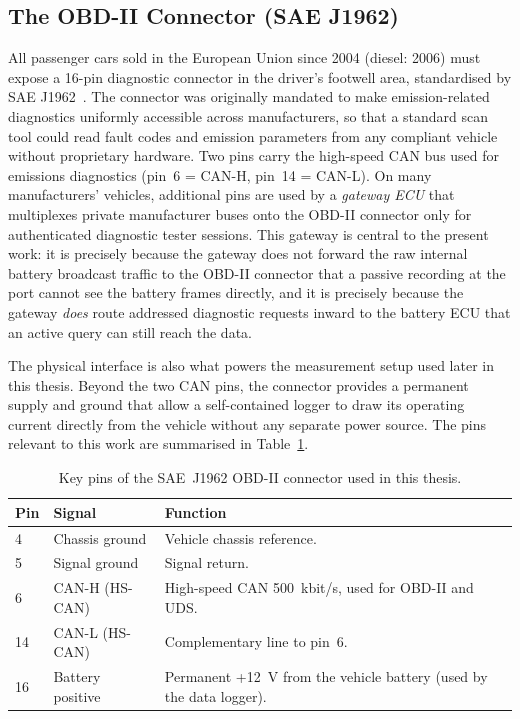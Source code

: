 \documentclass[11pt,a4paper,oneside,parskip=half]{scrreprt}
\begin{document}
\subsection{The OBD-II Connector (SAE J1962)}
All passenger cars sold in the European Union since 2004 (diesel: 2006) must expose a 16-pin diagnostic connector in the driver's footwell area, standardised by SAE J1962~\cite{saej1962}. The connector was originally mandated to make emission-related diagnostics uniformly accessible across manufacturers, so that a standard scan tool could read fault codes and emission parameters from any compliant vehicle without proprietary hardware. Two pins carry the high-speed CAN bus used for emissions diagnostics (pin~6 = CAN-H, pin~14 = CAN-L). On many manufacturers' vehicles, additional pins are used by a \textit{gateway ECU} that multiplexes private manufacturer buses onto the OBD-II connector only for authenticated diagnostic tester sessions. This gateway is central to the present work: it is precisely because the gateway does not forward the raw internal battery broadcast traffic to the OBD-II connector that a passive recording at the port cannot see the battery frames directly, and it is precisely because the gateway \emph{does} route addressed diagnostic requests inward to the battery ECU that an active query can still reach the data.

The physical interface is also what powers the measurement setup used later in this thesis. Beyond the two CAN pins, the connector provides a permanent supply and ground that allow a self-contained logger to draw its operating current directly from the vehicle without any separate power source. The pins relevant to this work are summarised in Table~\ref{tab:obd2_pins}.

\begin{table}[H]
\caption{Key pins of the SAE~J1962 OBD-II connector used in this thesis.}
\label{tab:obd2_pins}
\centering
\begin{tabular}{llp{7cm}}
\toprule
\textbf{Pin} & \textbf{Signal} & \textbf{Function} \\
\midrule
4  & Chassis ground           & Vehicle chassis reference. \\
5  & Signal ground            & Signal return. \\
6  & CAN-H (HS-CAN)           & High-speed CAN 500~kbit/s, used for OBD-II and UDS. \\
14 & CAN-L (HS-CAN)           & Complementary line to pin~6. \\
16 & Battery positive         & Permanent +12~V from the vehicle battery (used by the data logger). \\
\bottomrule
\end{tabular}
\end{table}
\end{document}
